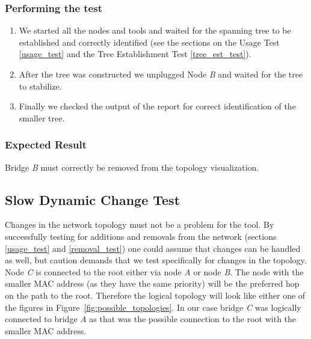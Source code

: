 \subsubsection*{Performing the test}
\begin{enumerate}
    \item We started all the nodes and tools and waited for the spanning tree to be established and correctly identified (see the sections on the Usage Test \ref{usage_test} and the Tree Establishment Test \ref{tree_est_test}).
    \item After the tree was constructed we unplugged Node \textit{B} and waited for the tree to stabilize.
    \item Finally we checked the output of the report for correct identification of the smaller tree.
\end{enumerate}

\subsubsection*{Expected Result}
Bridge \textit{B} must correctly be removed from the topology visualization.

\subsection*{Slow Dynamic Change Test}
\label{slow_dynamic_test}
Changes in the network topology must not be a problem for the tool.
By successfully testing for additions and removals from the network (sections \ref{usage_test} and \ref{removal_test}) one could assume that changes can be handled as well, but caution demands that we test specifically for changes in the topology.
Node \textit{C} is connected to the root either via node \textit{A} or node \textit{B}.
The node with the smaller MAC address (as they have the same priority) will be the preferred hop on the path to the root.
Therefore the logical topology will look like either one of the figures in Figure~\ref{fig:possible_topologies}.
In our case bridge \textit{C} was logically connected to bridge \textit{A} as that was the possible connection to the root with the smaller MAC address.

